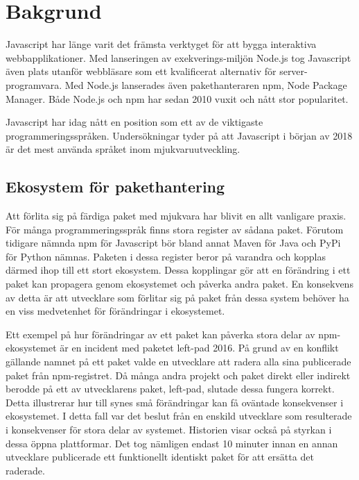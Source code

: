 \section{Bakgrund}
\label{sec:joel_o-background}

Javascript har länge varit det främsta verktyget för att bygga interaktiva webbapplikationer. Med lanseringen av exekverings-miljön Node.js tog Javascript även plats utanför webbläsare som ett kvalificerat alternativ för server-programvara. Med Node.js lanserades även pakethanteraren npm, Node Package Manager. Både Node.js och npm har sedan 2010 vuxit och nått stor popularitet. \cite{node-timeline}

Javascript har idag nått en position som ett av de viktigaste programmeringsspråken. Undersökningar tyder på att Javascript i början av 2018 är det mest använda språket inom mjukvaruutveckling.\cite{githut}\cite{so-survey}

\subsection{Ekosystem för pakethantering}
Att förlita sig på färdiga paket med mjukvara har blivit en allt vanligare praxis. För många programmeringsspråk finns stora register av sådana paket. Förutom tidigare nämnda npm för Javascript bör bland annat Maven för Java och PyPi för Python nämnas. Paketen i dessa register beror på varandra och kopplas därmed ihop till ett stort ekosystem. Dessa kopplingar gör att en förändring i ett paket kan propagera genom ekosystemet och påverka andra paket. En konsekvens av detta är att utvecklare som förlitar sig på paket från dessa system behöver ha en viss medvetenhet för förändringar i ekosystemet.\cite{Henry2017}

Ett exempel på hur förändringar av ett paket kan påverka stora delar av npm-ekosystemet är en incident med paketet left-pad 2016. På grund av en konflikt gällande namnet på ett paket valde en utvecklare att radera alla sina publicerade paket från npm-registret. Då många andra projekt och paket direkt eller indirekt berodde på ett av utvecklarens paket, left-pad, slutade dessa fungera korrekt. Detta illustrerar hur till synes små förändringar kan få oväntade konsekvenser i ekosystemet. I detta fall var det beslut från en enskild utvecklare som resulterade i konsekvenser för stora delar av systemet. Historien visar också på styrkan i dessa öppna plattformar. Det tog nämligen endast 10 minuter innan en annan utvecklare publicerade ett funktionellt identiskt paket för att ersätta det raderade.\cite{npm-left-pad}

